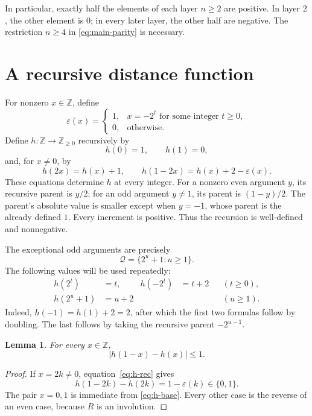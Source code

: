 \documentclass[11pt]{article}
\newtheorem{lemma}[theorem]{Lemma}
\theoremstyle{remark}
\newcommand{\Z}{\mathbb Z}
\begin{document}
In particular, exactly half the elements of each layer $n\ge2$ are
positive. In layer $2$, the other element is $0$; in every later layer,
the other half are negative. The restriction $n\ge4$ in
\eqref{eq:main-parity} is necessary.

\section{A recursive distance function}

For nonzero $x\in\Z$, define
\[
\varepsilon(x)=
\begin{cases}
1,&x=-2^t\text{ for some integer }t\ge0,\\
0,&\text{otherwise}.
\end{cases}
\]
Define $h:\Z\to\Z_{\ge0}$ recursively by
\begin{equation}\label{eq:h-base}
h(0)=1,\qquad h(1)=0,
\end{equation}
and, for $x\ne0$, by
\begin{equation}\label{eq:h-rec}
h(2x)=h(x)+1,\qquad
h(1-2x)=h(x)+2-\varepsilon(x).
\end{equation}
These equations determine $h$ at every integer. For a nonzero even
argument $y$, its recursive parent is $y/2$; for an odd argument $y\ne1$,
its parent is $(1-y)/2$. The parent's absolute value is smaller except
when $y=-1$, whose parent is the already defined $1$. Every increment
is positive. Thus the recursion is well-defined and nonnegative.

The exceptional odd arguments are precisely
\begin{equation}\label{eq:seeds}
\mathcal Q=\{2^u+1:u\ge1\}.
\end{equation}
The following values will be used repeatedly:
\begin{equation}\label{eq:explicit}
\begin{aligned}
h(2^t)&=t,& h(-2^t)&=t+2 &&(t\ge0),\\
h(2^u+1)&=u+2 &&&&(u\ge1).
\end{aligned}
\end{equation}
Indeed, $h(-1)=h(1)+2=2$, after which the first two formulas follow
by doubling. The last follows by taking the recursive parent
$-2^{u-1}$.

\begin{lemma}\label{lem:R}
For every $x\in\Z$,
\[
|h(1-x)-h(x)|\le1.
\]
\end{lemma}

\begin{proof}
If $x=2k\ne0$, equation~\eqref{eq:h-rec} gives
\[
h(1-2k)-h(2k)=1-\varepsilon(k)\in\{0,1\}.
\]
The pair $x=0,1$ is immediate from \eqref{eq:h-base}. Every other
case is the reverse of an even case, because $R$ is an involution.
\end{proof}
\end{document}
